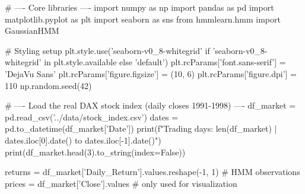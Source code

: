 
\begin{codebox}[title={Core libraries}]
# ---- Core libraries ----
import numpy as np
import pandas as pd
import matplotlib.pyplot as plt
import seaborn as sns
from hmmlearn.hmm import GaussianHMM

# Styling setup
plt.style.use('seaborn-v0_8-whitegrid' if 'seaborn-v0_8-whitegrid' in plt.style.available else 'default')
plt.rcParams['font.sans-serif'] = 'DejaVu Sans'
plt.rcParams['figure.figsize'] = (10, 6)
plt.rcParams['figure.dpi'] = 110
np.random.seed(42)

# ---- Load the real DAX stock index (daily closes 1991-1998) ----
df_market = pd.read_csv('../data/stock_index.csv')
dates = pd.to_datetime(df_market['Date'])
print(f"Trading days: {len(df_market)} | {dates.iloc[0].date()} to {dates.iloc[-1].date()}")
print(df_market.head(3).to_string(index=False))

returns = df_market['Daily_Return'].values.reshape(-1, 1)   # HMM observations
prices = df_market['Close'].values                          # only used for visualization
\end{codebox}


